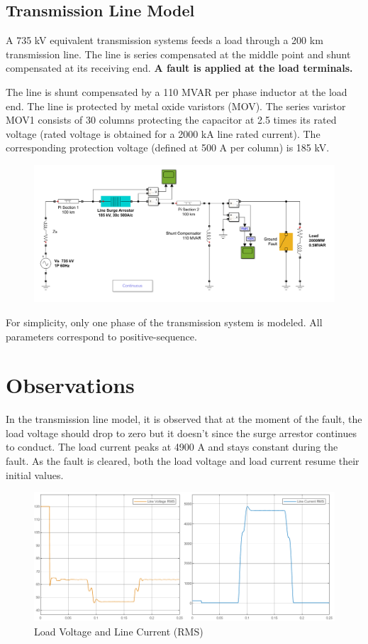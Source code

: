 \documentclass[a4paper,12pt]{article}
\begin{document}
    \subsection{Transmission Line Model}
    A 735 kV equivalent transmission systems feeds a load through a 200 km transmission line. 
    The line is series compensated at the middle point and shunt compensated at its receiving end. 
    {\bf A fault is applied at the load terminals.}

    The line is shunt compensated by a 110 MVAR per phase inductor at the load end.
    The line is protected by metal oxide varistors (MOV). The series varistor MOV1 consists 
    of 30 columns protecting the capacitor at 2.5 times its rated voltage 
    (rated voltage is obtained for a 2000 kA line rated current). 
    The corresponding protection voltage (defined at 500 A per column) is 185 kV.


    \begin{figure}[H]
      \centering
      \includegraphics[width=6in]{img/model.png}
    \end{figure}

    For simplicity, only one phase of the transmission system is modeled. 
    All parameters correspond to positive-sequence.

  \pagebreak
  \section{Observations}  
  In the transmission line model, it is observed that at the moment of the fault, the load voltage
  should drop to zero but it doesn't since the surge arrestor continues to conduct.
  The load current peaks at 4900 A and stays constant during the fault.
  As the fault is cleared, both the load voltage and load current resume their initial values.
  \begin{figure}[H]
    \centering
    \includegraphics[width=6in]{img/line_current_rms.png}
    \caption{Load Voltage and Line Current (RMS)}
  \end{figure}
\end{document}

